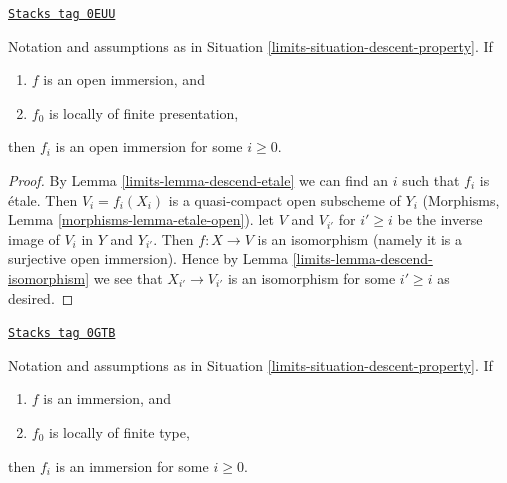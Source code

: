 \begin{lemma}
\label{limits-lemma-descend-open-immersion}
\href{https://stacks.math.columbia.edu/tag/0EUU}{\texttt{Stacks tag 0EUU}}

Notation and assumptions as in Situation \ref{limits-situation-descent-property}.
If
\begin{enumerate}
\item $f$ is an open immersion, and
\item $f_0$ is locally of finite presentation,
\end{enumerate}
then $f_i$ is an open immersion for some $i \geq 0$.
\end{lemma}

\begin{proof}

By Lemma \ref{limits-lemma-descend-etale} we can find an $i$ such that $f_i$
is \'etale. Then $V_i = f_i(X_i)$ is a quasi-compact open subscheme
of $Y_i$ (Morphisms, Lemma \ref{morphisms-lemma-etale-open}).
let $V$ and $V_{i'}$ for $i' \geq i$ be the inverse image of $V_i$
in $Y$ and $Y_{i'}$. Then $f : X \to V$ is an isomorphism
(namely it is a surjective open immersion). Hence by
Lemma \ref{limits-lemma-descend-isomorphism} we see that
$X_{i'} \to V_{i'}$ is an isomorphism
for some $i' \geq i$ as desired.
\end{proof}

\begin{lemma}
\label{limits-lemma-descend-immersion}
\href{https://stacks.math.columbia.edu/tag/0GTB}{\texttt{Stacks tag 0GTB}}

Notation and assumptions as in Situation \ref{limits-situation-descent-property}.
If
\begin{enumerate}
\item $f$ is an immersion, and
\item $f_0$ is locally of finite type,
\end{enumerate}
then $f_i$ is an immersion for some $i \geq 0$.
\end{lemma}

